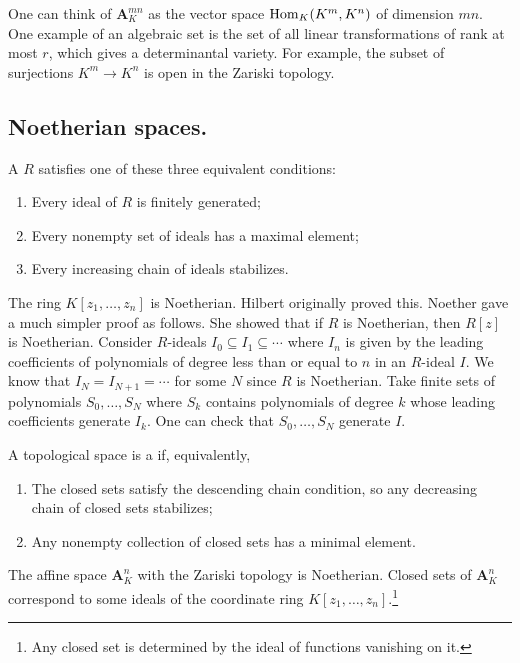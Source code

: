 \documentclass [11 pt, oneside] {article}
\begin{document}
\begin{example}\label{}
One can think of $\mathbf{A}^{mn}_K$ as the vector space $\operatorname{Hom}_K(K^m,K^n)$ of dimension $mn$. One example of an algebraic set is the set of all linear transformations of rank at most $r$, which gives a determinantal variety. For example, the subset of surjections $K^m\longrightarrow K^n$ is open in the Zariski topology.
\end{example}

\subsection{Noetherian spaces.}
\begin{definition}[ ]\label{}
A  $R$ satisfies one of these three equivalent conditions:
\begin{enumerate}
	\item Every ideal of $R$ is finitely generated;
	\item Every nonempty set of ideals has a maximal element;
	\item Every increasing chain of ideals stabilizes. 
\end{enumerate}
\end{definition}

\begin{example}[ ]\label{}
The ring $K[z_1,\hdots,z_n]$ is Noetherian. Hilbert originally proved this. Noether gave a much simpler proof as follows. She showed that if $R$ is Noetherian, then $R[z]$ is Noetherian. Consider $R$-ideals $I_0\subseteq I_1\subseteq\cdots$ where $I_n$ is given by the leading coefficients of polynomials of degree less than or equal to $n$ in an $R$-ideal $I$. We know that $I_N=I_{N+1}=\cdots$ for some $N$ since $R$ is Noetherian. Take finite sets of polynomials $S_0,\hdots, S_N$ where $S_k$ contains polynomials of degree $k$ whose leading coefficients generate $I_k$. One can check that $S_0,\hdots, S_N$ generate $I$. 
\end{example}

\begin{definition}[ ]\label{}
A topological space is a  if, equivalently,
\begin{enumerate}
	\item The closed sets satisfy the descending chain condition, so any decreasing chain of closed sets stabilizes;
	\item Any nonempty collection of closed sets has a minimal element.
\end{enumerate}
\end{definition}
 \begin{remark}
 	The affine space $\mathbf{A}^n_K$ with the Zariski topology is Noetherian. Closed sets of $\mathbf{A}^n_K$ correspond to some ideals of the coordinate ring $K[z_1,\hdots, z_n]$.\footnote{Any closed set is determined by the ideal of functions vanishing on it.}
 \end{remark}
\end{document}
